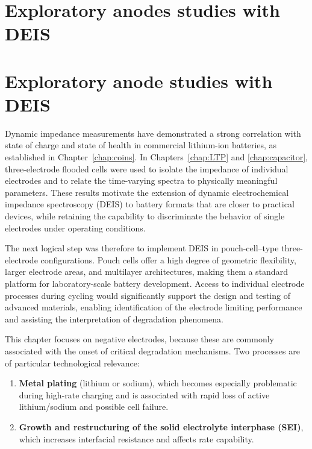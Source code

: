 \chapter{Exploratory anodes studies with DEIS}
\label{chap:anodes}

\chapter{Exploratory anode studies with DEIS}

Dynamic impedance measurements have demonstrated a strong correlation with state of charge and state of health in commercial lithium-ion batteries, as established in Chapter~\ref{chap:coins}.  
In Chapters~\ref{chap:LTP} and \ref{chap:capacitor}, three-electrode flooded cells were used to isolate the impedance of individual electrodes and to relate the time-varying spectra to physically meaningful parameters.  
These results motivate the extension of dynamic electrochemical impedance spectroscopy (DEIS) to battery formats that are closer to practical devices, while retaining the capability to discriminate the behavior of single electrodes under operating conditions.

The next logical step was therefore to implement DEIS in pouch-cell--type three-electrode configurations.  
Pouch cells offer a high degree of geometric flexibility, larger electrode areas, and multilayer architectures, making them a standard platform for laboratory-scale battery development.  
Access to individual electrode processes during cycling would significantly support the design and testing of advanced materials, enabling identification of the electrode limiting performance and assisting the interpretation of degradation phenomena.

This chapter focuses on negative electrodes, because these are commonly associated with the onset of critical degradation mechanisms.  
Two processes are of particular technological relevance:
\begin{enumerate}
    \item \textbf{Metal plating} (lithium or sodium), which becomes especially problematic during high-rate charging and is associated with rapid loss of active lithium/sodium and possible cell failure.
    \item \textbf{Growth and restructuring of the solid electrolyte interphase (SEI)}, which increases interfacial resistance and affects rate capability.
\end{enumerate}

